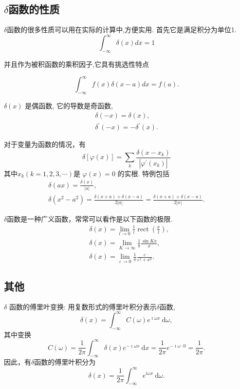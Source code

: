 \subsection{$\delta$函数的性质}
$\delta$函数的很多性质可以用在实际的计算中,方便实用. 首先它是满足积分为单位1.
$$
\int_{-\infty}^{\infty} \delta(x) d x=1
$$

并且作为被积函数的乘积因子,它具有挑选性特点

$$
\int_{-\infty}^{\infty} f(x) \delta(x-a) d x=f(a).
$$

$\delta(x)$ 是偶函数, 它的导数是奇函数,
$$
\begin{gathered}
\delta(-x)=\delta(x), \\
\delta^{\prime}(-x)=-\delta^{\prime}(x) .
\end{gathered}
$$

对于变量为函数的情况，有
\begin{equation}
    \delta[\varphi(x)]=\sum_k \frac{\delta\left(x-x_k\right)}{\left|\varphi^{\prime}\left(x_k\right)\right|}
\end{equation}
其中$x_k(k=1,2,3, \cdots)$是
$\varphi(x)=0$ 的实根.
特例包括
\begin{equation}
    \begin{gathered}
    \delta(a x)=\frac{\delta(x)}{|a|}, \\
    \delta\left(x^2-a^2\right)=\frac{\delta(x+a)+\delta(x-a)}{2|a|}=\frac{\delta(x+a)+\delta(x-a)}{2|x|} .
    \end{gathered}
\end{equation}

$\delta$函数是一种广义函数，常常可以看作是以下函数的极限.
\begin{equation}
    \begin{aligned}
    & \delta(x)=\lim _{l \rightarrow 0} \frac{1}{l} \operatorname{rect}\left(\frac{x}{l}\right), \\
    & \delta(x)=\lim _{K \rightarrow \infty} \frac{1}{\pi} \frac{\sin K x}{x}, \\
    & \delta(x)=\lim _{\varepsilon \rightarrow 0} \frac{1}{\pi} \frac{\varepsilon}{\varepsilon^2+x^2} .
    \end{aligned}
\end{equation}

\subsection{其他}
$\delta$ 函数的傅里叶变换: 用复数形式的傅里叶积分表示$\delta$函数,
\begin{equation}
\delta(x)=\int_{-\infty}^{\infty} C(\omega) e^{\imath\omega x} \mathrm{~d} \omega,
\end{equation}
其中变换
$$
C(\omega)=\frac{1}{2 \pi} \int_{-\infty}^{\infty} \delta(x) e^{-\imath\omega x} \mathrm{~d} x=\frac{1}{2 \pi} e^{-\imath\omega \cdot 0}=\frac{1}{2 \pi} .
$$
因此，有$\delta$函数的傅里叶积分为
\begin{equation}
\delta(x)=\frac{1}{2 \pi} \int_{-\infty}^{\infty} e^{i \omega x} \mathrm{~d} \omega .
\end{equation}

